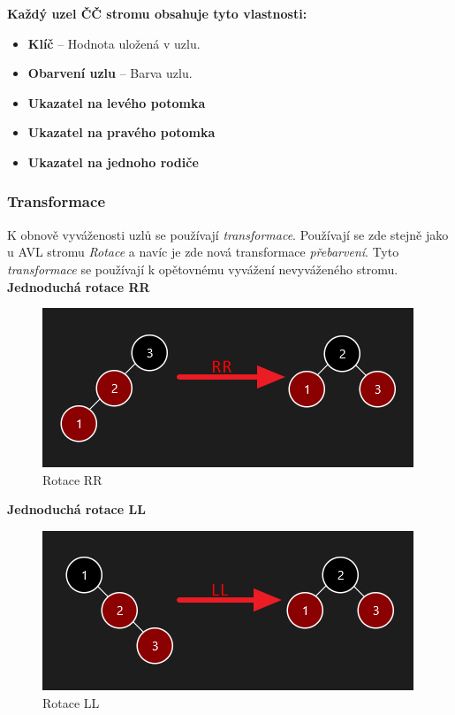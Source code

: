\documentclass[
  biblatex=false,
  font=serif,
  glossaries=false,
  tables=false,
  theorems=false,
  index
]{kidiplom}
\begin{document}
\newpage
\noindent\textbf{Každý uzel ČČ stromu obsahuje tyto vlastnosti:}
\begin{itemize}
\item \textbf{Klíč} -- Hodnota uložená v uzlu.
\item \textbf{Obarvení uzlu} -- Barva uzlu.
\item \textbf{Ukazatel na levého potomka}
\item \textbf{Ukazatel na pravého potomka}
\item \textbf{Ukazatel na jednoho rodiče}
\end{itemize}

\subsubsection{Transformace}
\indent\indent K obnově vyváženosti uzlů se používají \textit{transformace}. Používají se zde stejně jako u AVL stromu \textit{Rotace} a navíc je zde nová transformace \textit{přebarvení}. Tyto \textit{transformace} se používají k opětovnému vyvážení nevyváženého stromu.\\

\noindent\textbf{Jednoduchá rotace RR}
\begin{figure}[h!]
\centering
	\includegraphics[scale=0.8]{obrazky/18RR.png}
	\caption{Rotace RR}
\end{figure}

\noindent\textbf{Jednoduchá rotace LL}
\begin{figure}[h!]
\centering
	\includegraphics[scale=0.8]{obrazky/19LL.png}
	\caption{Rotace LL}
\end{figure}
\end{document}
